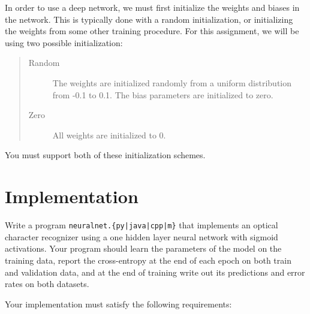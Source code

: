 \documentclass[11pt,addpoints,answers]{exam}
\begin{document}
In order to use a deep network, we must first initialize the weights and biases in the network. This is typically done with a random initialization, or initializing the weights from some other training procedure. For this assignment, we will be using two possible initialization: 
\begin{quote}
\begin{description}
\item[{\sc Random}] The weights are initialized randomly from a uniform distribution from -0.1 to 0.1. The bias parameters are initialized to zero.
\item[{\sc Zero}] All weights are initialized to 0.  
\end{description}
\end{quote}

You must support both of these initialization schemes.

\section{Implementation}
\label{sec:model}
Write a program \texttt{neuralnet.\{py|java|cpp|m\}} that implements an optical character recognizer using a one hidden layer neural network with sigmoid activations. Your program should learn the parameters of the model on the training data, report the cross-entropy at the end of each epoch on both train and validation data, and at the end of training write out its predictions and error rates on both datasets. 
%

Your implementation must satisfy the following requirements:
\end{document}
